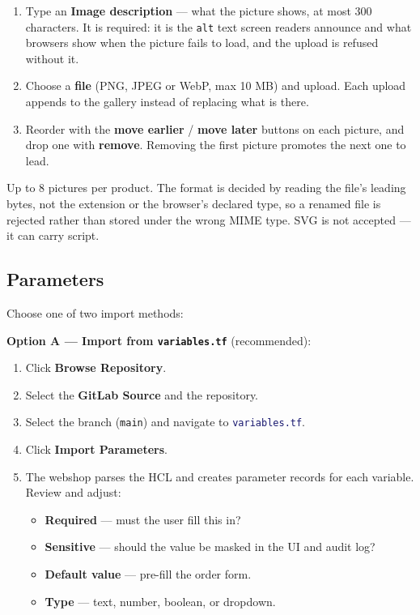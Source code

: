 \documentclass[12pt,a4paper,twoside]{report}
\newcommand{\notebox}[1]{\begin{tcolorbox}[noteboxstyle]#1\end{tcolorbox}}
\newcommand{\code}[1]{\texttt{#1}}
\newcommand{\file}[1]{\texttt{\textcolor{MidnightBlue}{#1}}}
\begin{document}
\begin{enumerate}
  \item Type an \textbf{Image description} --- what the picture shows, at most
        300 characters. It is required: it is the \code{alt} text screen
        readers announce and what browsers show when the picture fails to
        load, and the upload is refused without it.
  \item Choose a \textbf{file} (PNG, JPEG or WebP, max 10 MB) and upload. Each
        upload appends to the gallery instead of replacing what is there.
  \item Reorder with the \textbf{move earlier} / \textbf{move later} buttons on
        each picture, and drop one with \textbf{remove}. Removing the first
        picture promotes the next one to lead.
\end{enumerate}

\notebox{Up to 8 pictures per product. The format is decided by reading the
file's leading bytes, not the extension or the browser's declared type, so a
renamed file is rejected rather than stored under the wrong MIME type. SVG is
not accepted --- it can carry script.}

\subsection{Parameters}

Choose one of two import methods:

\textbf{Option A — Import from \texttt{variables.tf}} (recommended):

\begin{enumerate}
  \item Click \textbf{Browse Repository}.
  \item Select the \textbf{GitLab Source} and the repository.
  \item Select the branch (\code{main}) and navigate to
        \file{variables.tf}.
  \item Click \textbf{Import Parameters}.
  \item The webshop parses the HCL and creates parameter records for
        each variable. Review and adjust:
        \begin{itemize}
          \item \textbf{Required} — must the user fill this in?
          \item \textbf{Sensitive} — should the value be masked in
                the UI and audit log?
          \item \textbf{Default value} — pre-fill the order form.
          \item \textbf{Type} — text, number, boolean, or dropdown.
        \end{itemize}
\end{enumerate}
\end{document}
